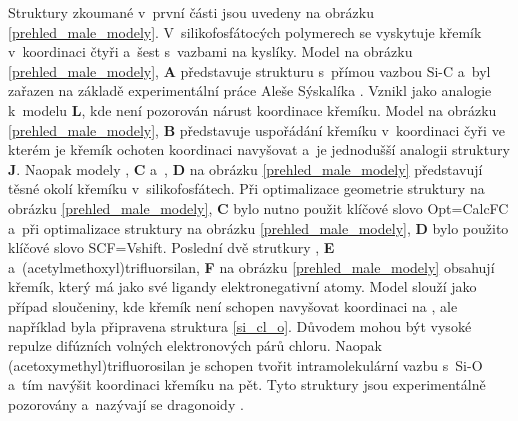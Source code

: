 \documentclass[
digital, %
table,   %
lof,     %
lot,     %
oneside,
]{fithesis3}
\begin{document}
Struktury zkoumané v~první části jsou uvedeny na obrázku \ref{prehled_male_modely}. V~silikofosfátocých polymerech se vyskytuje křemík v~koordinaci čtyři a~šest s~vazbami na kyslíky. Model  na obrázku \ref{prehled_male_modely}, \textbf{A} představuje strukturu s~přímou vazbou Si-C a~byl zařazen na základě experimentální práce Aleše Sýskalíka \cite{Styskalik2015thesis}. Vznikl jako analogie k~modelu \textbf{L}, kde není pozorován nárust koordinace křemíku.  Model  na obrázku \ref{prehled_male_modely}, \textbf{B} představuje uspořádání křemíku v~koordinaci čyři ve kterém je křemík ochoten koordinaci navyšovat a~je jednodušší analogii struktury \textbf{J}. Naopak modely , \textbf{C} a~, \textbf{D} na obrázku \ref{prehled_male_modely} představují těsné okolí křemíku v~silikofosfátech. Při optimalizace geometrie struktury  na obrázku \ref{prehled_male_modely}, \textbf{C} bylo nutno použit klíčové slovo Opt=CalcFC a~při optimalizace struktury   na obrázku \ref{prehled_male_modely}, \textbf{D} bylo použito klíčové slovo SCF=Vshift.
Poslední dvě strutkury  ,  \textbf{E} a~(acetylmethoxyl)trifluorsilan, \textbf{F} na obrázku \ref{prehled_male_modely} obsahují křemík, který má jako své ligandy elektronegativní atomy. Model  slouží jako případ sloučeniny, kde křemík není schopen navyšovat koordinaci na , ale například byla připravena struktura \ref{si_cl_o}. Důvodem mohou být vysoké repulze difúzních volných elektronových párů chloru. Naopak (acetoxymethyl)trifluorosilan je schopen tvořit intramolekulární vazbu s~Si-O a~tím navýšit koordinaci křemíku na pět. Tyto  struktury jsou experimentálně pozorovány a~nazývají se dragonoidy \cite{Chipanina2011}.\\
\end{document}
